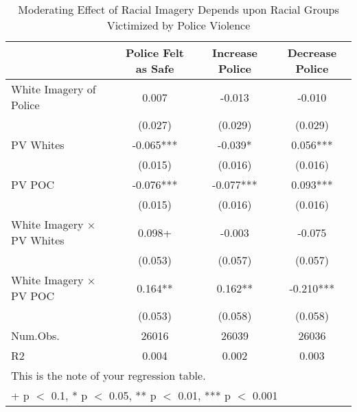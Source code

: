 \begin{table}

\caption{Moderating Effect of Racial Imagery Depends upon Racial Groups Victimized by Police Violence}
\centering
\begin{tabular}[t]{lccc}
\toprule
  & Police Felt as Safe & Increase Police & Decrease Police\\
\midrule
White Imagery of Police & 0.007 & -0.013 & -0.010\\
 & (0.027) & (0.029) & (0.029)\\
PV Whites & -0.065*** & -0.039* & 0.056***\\
 & (0.015) & (0.016) & \vphantom{1} (0.016)\\
PV POC & -0.076*** & -0.077*** & 0.093***\\
 & (0.015) & (0.016) & (0.016)\\
White Imagery × PV Whites & 0.098+ & -0.003 & -0.075\\
 & (0.053) & (0.057) & (0.057)\\
White Imagery × PV POC & 0.164** & 0.162** & -0.210***\\
 & (0.053) & (0.058) & (0.058)\\
\midrule
Num.Obs. & 26016 & 26039 & 26036\\
R2 & 0.004 & 0.002 & 0.003\\
\bottomrule
\multicolumn{4}{l}{\rule{0pt}{1em}This is the note of your regression table.}\\
\multicolumn{4}{l}{\rule{0pt}{1em}+ p $<$ 0.1, * p $<$ 0.05, ** p $<$ 0.01, *** p $<$ 0.001}\\
\end{tabular}
\end{table}
